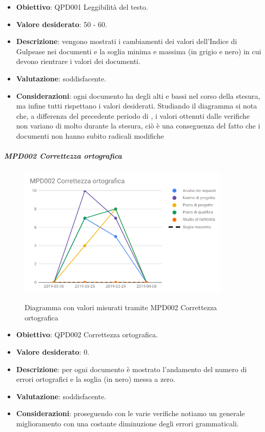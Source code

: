 		\begin{itemize}
			\item \textbf{Obiettivo}: QPD001 Leggibilità del testo.
			\item \textbf{Valore desiderato}: 50 - 60.
			\item \textbf{Descrizione}: vengono mostrati i cambiamenti dei valori dell'Indice di Gulpease nei documenti e la soglia minima e massima (in grigio e nero) in cui devono rientrare i valori dei documenti.
			\item \textbf{Valutazione}: soddisfacente.
			\item \textbf{Considerazioni}: ogni documento ha degli alti e bassi nel corso della stesura, ma infine tutti rispettano i valori desiderati. Studiando il diagramma si nota che, a differenza del
			precedente periodo di \RP, i valori ottenuti dalle verifiche non variano di molto durante la
			stesura, ciò è una conseguenza del fatto che i documenti non hanno subito radicali modifiche

		\end{itemize}

		\subparagraph{MPD002 Correttezza ortografica}

		\begin{figure}[H]
			\centering
			\includegraphics[width=0.9\textwidth]{img/cruscotti/RQ/MPD002.png}
			\label{immagineCorrettezzaOrtograficaRQ}
			\caption{Diagramma con valori misurati tramite MPD002 Correttezza ortografica}
		\end{figure}

		\begin{itemize}
			\item \textbf{Obiettivo}: QPD002 Correttezza ortografica.
			\item \textbf{Valore desiderato}: 0.
			\item \textbf{Descrizione}: per ogni documento è mostrato l'andamento del numero di errori ortografici e la soglia (in nero) messa a zero.
			\item \textbf{Valutazione}: soddisfacente.
			\item \textbf{Considerazioni}: proseguendo con le varie verifiche notiamo un generale
			miglioramento con una costante diminuzione degli errori grammaticali.
		\end{itemize}
	

